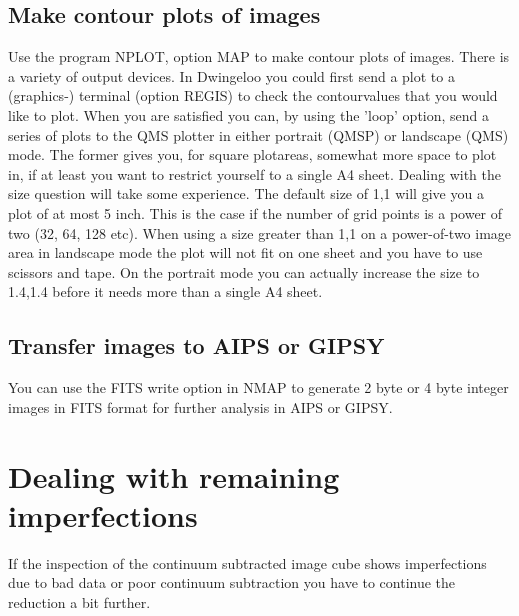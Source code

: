 \subsection{Make contour plots of images} 
\label{.detail.contour} 

Use the program NPLOT, option MAP to make contour plots of images. There is a
variety of output devices. In Dwingeloo you could first send a plot to a
(graphics-) terminal  (option REGIS) to check the contourvalues that you would
like to plot. When you are satisfied you can, by using the 'loop' option, send
a series of plots to the QMS plotter in either portrait (QMSP) or landscape
(QMS) mode. The former gives you, for square plotareas, somewhat more space to
plot in, if at least you want to restrict yourself to a single A4 sheet.
Dealing with the size question will take some experience. The default size of
1,1 will give you a plot of at most 5 inch. This is the case if the number of
grid points is a power of two (32, 64, 128 etc). When using a size greater than
1,1 on a power-of-two image area in landscape mode the plot will not fit on one
sheet and you have to use scissors and tape. On the portrait mode you can
actually increase the size to 1.4,1.4 before it needs more than a single A4
sheet. 


\subsection{Transfer images to AIPS or GIPSY} 
\label{.detail.transcube} 

You can use the FITS write option in NMAP to generate 2 byte or 4 byte integer
images in FITS format for further analysis in AIPS or GIPSY. 





\section{Dealing with remaining imperfections} 
\label{.remain} 

If the inspection of the continuum subtracted image cube shows imperfections
due to bad data or poor continuum subtraction you have to continue the
reduction a bit further. 


